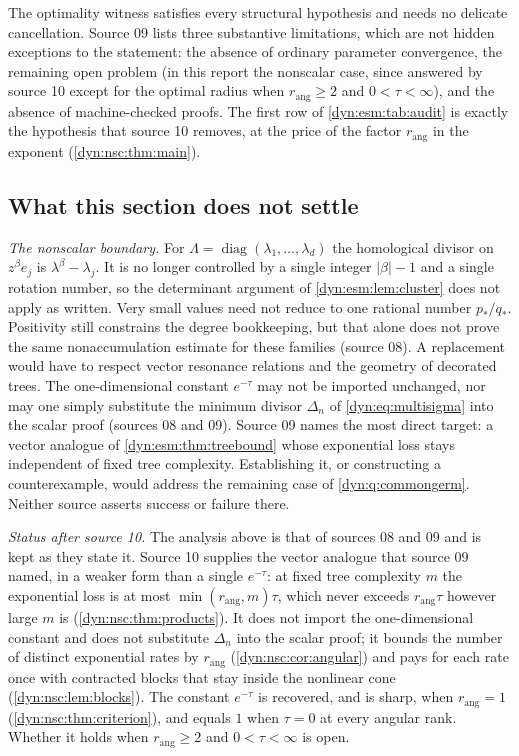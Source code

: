 \documentclass[11pt,letterpaper]{article}
\theoremstyle{definition}
\theoremstyle{remark}
\newcommand{\rang}{r_{\mathrm{ang}}}
\numberwithin{equation}{section}
\begin{document}
The optimality witness satisfies every structural hypothesis and needs no
delicate cancellation. Source 09 lists three substantive limitations,
which are not hidden exceptions to the statement: the absence of ordinary
parameter convergence, the remaining open problem (in this report the
nonscalar case, since answered by source 10 except for the optimal radius
when $\rang\ge2$ and $0<\tau<\infty$), and the absence of machine-checked proofs. The first row
of \cref{dyn:esm:tab:audit} is exactly the hypothesis that source 10
removes, at the price of the factor $\rang$ in the exponent
(\cref{dyn:nsc:thm:main}).

\subsection{What this section does not settle}
\label{dyn:esm:subsec:limits}

\emph{The nonscalar boundary.} For
$\Lambda=\operatorname{diag}(\lambda_1,\dots,\lambda_d)$ the homological
divisor on $z^{\beta}e_j$ is $\lambda^{\beta}-\lambda_j$. It is no longer
controlled by a single integer $|\beta|-1$ and a single rotation number, so
the determinant argument of \cref{dyn:esm:lem:cluster} does not apply as
written. Very small values need not reduce to one rational number $p_*/q_*$.
Positivity still constrains the degree bookkeeping, but that alone does not
prove the same nonaccumulation estimate for these families (source 08). A
replacement would have to respect vector resonance relations and the
geometry of decorated trees. The one-dimensional constant $e^{-\tau}$ may
not be imported unchanged, nor may one simply substitute the minimum divisor
$\Delta_n$ of \eqref{dyn:eq:multisigma} into the scalar proof (sources 08
and 09). Source 09 names the most direct target: a vector analogue of
\cref{dyn:esm:thm:treebound} whose exponential loss stays independent of
fixed tree complexity. Establishing it, or constructing a counterexample,
would address the remaining case of \cref{dyn:q:commongerm}. Neither source
asserts success or failure there.

\emph{Status after source 10.} The analysis above is that of sources 08 and
09 and is kept as they state it. Source 10 supplies the vector analogue that
source 09 named, in a weaker form than a single $e^{-\tau}$: at fixed tree
complexity $m$ the exponential loss is at most $\min(\rang,m)\tau$, which
never exceeds $\rang\tau$ however large $m$ is
(\cref{dyn:nsc:thm:products}). It
does not import the one-dimensional constant and does not substitute
$\Delta_n$ into the scalar proof; it bounds the number of distinct
exponential rates by $\rang$ (\cref{dyn:nsc:cor:angular}) and pays for each
rate once with contracted blocks that stay inside the nonlinear cone
(\cref{dyn:nsc:lem:blocks}). The constant $e^{-\tau}$ is recovered, and is
sharp, when $\rang=1$ (\cref{dyn:nsc:thm:criterion}), and equals $1$ when
$\tau=0$ at every angular rank. Whether it holds when $\rang\ge2$ and
$0<\tau<\infty$ is open.
\end{document}
